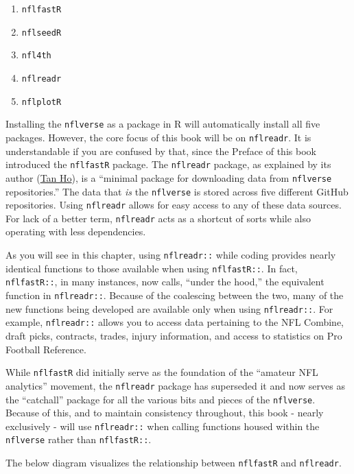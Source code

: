 \documentclass[
  letterpaper,
]{krantz}
\providecommand{\tightlist}{%
  \setlength{\itemsep}{0pt}\setlength{\parskip}{0pt}}\usepackage{longtable,booktabs,array}
\begin{document}
\begin{enumerate}
\def\labelenumi{\arabic{enumi}.}
\tightlist
\item
  \texttt{nflfastR}
\item
  \texttt{nflseedR}
\item
  \texttt{nfl4th}
\item
  \texttt{nflreadr}
\item
  \texttt{nflplotR}
\end{enumerate}

Installing the \texttt{nflverse} as a package in R will automatically
install all five packages. However, the core focus of this book will be
on \texttt{nflreadr}. It is understandable if you are confused by that,
since the Preface of this book introduced the \texttt{nflfastR} package.
The \texttt{nflreadr} package, as explained by its author
(\href{https://tanho.ca/}{Tan Ho}), is a ``minimal package for
downloading data from \texttt{nflverse} repositories.'' The data that
\emph{is} the \texttt{nflverse} is stored across five different GitHub
repositories. Using \texttt{nflreadr} allows for easy access to any of
these data sources. For lack of a better term, \texttt{nflreadr} acts as
a shortcut of sorts while also operating with less dependencies.

As you will see in this chapter, using \texttt{nflreadr::} while coding
provides nearly identical functions to those available when using
\texttt{nflfastR::}. In fact, \texttt{nflfastR::}, in many instances,
now calls, ``under the hood,'' the equivalent function in
\texttt{nflreadr::}. Because of the coalescing between the two, many of
the new functions being developed are available only when using
\texttt{nflreadr::}. For example, \texttt{nflreadr::} allows you to
access data pertaining to the NFL Combine, draft picks, contracts,
trades, injury information, and access to statistics on Pro Football
Reference.

While \texttt{nflfastR} did initially serve as the foundation of the
``amateur NFL analytics'' movement, the \texttt{nflreadr} package has
superseded it and now serves as the ``catchall'' package for all the
various bits and pieces of the \texttt{nflverse}. Because of this, and
to maintain consistency throughout, this book - nearly exclusively -
will use \texttt{nflreadr::} when calling functions housed within the
\texttt{nflverse} rather than \texttt{nflfastR::}.

The below diagram visualizes the relationship between \texttt{nflfastR}
and \texttt{nflreadr}.
\end{document}
